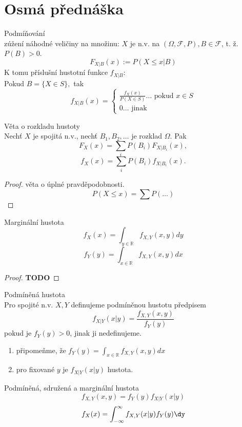 \documentclass[../main.tex]{subfiles}
\begin{document}
\section{Osmá přednáška}

\begin{definition}
    Podmíňování\\

    zúžení náhodné veličiny na množinu: $X$ je n.v. na $(\Omega, \mathcal{F},P), B \in \mathcal{F}$, t. ž. $P(B) >0$.
    \[F_{X|B}(x):= P(X \leq x |B)\]
    K tomu příslušní hustotní funkce $f_{X|B}$:\\
    Pokud $B = \{X\in S\},$ tak 
    \[f_{X|B}(x) = 
    \begin{cases}    
        \frac{f_X(x)}{P(X\in S)} \dots \text{ pokud } x\in S\\
        0 \dots \text{ jinak }
    \end{cases}\]
\end{definition}
\begin{theorem}
    Věta o rozkladu hustoty\\

    Nechť $X$ je spojitá n.v., nechť $B_1,B_2,\dots$ je rozklad $\Omega$. Pak
    \[F_X(x) = \sum_i P(B_i)F_{X|B_i}(x),\]
    \[f_X(x) = \sum_i P(B_i)f_{X|B_i}(x).\]
    \begin{proof}
        věta o úplné pravděpodobnosti. 
        \[P(X\leq x) = \sum P(\dots)\]
    \end{proof}
\end{theorem}

\begin{theorem}
    Marginální hustota\\

    \[f_X(x) = \int_{y\in \mathbb{R}} f_{X,Y}(x,y)dy\]
    \[f_Y(y) = \int_{x\in \mathbb{R}} f_{X,Y}(x,y)dx\]
\end{theorem}
\begin{proof}
    \textbf{TODO}
\end{proof}

\begin{definition}
    Podmíněná hustota\\

    Pro spojité n.v. $X,Y$ definujeme podmíněnou hustotu předpisem
    \[f_{X|Y}(x|y) = \frac{f_{X,Y}(x,y)}{f_{Y}(y)}\]
    pokud je $f_Y(y) > 0$, jinak ji nedefinujeme.
    \begin{enumerate}
        \item připomeňme, že $f_Y(y) = \int_{x\in \mathbb{R}}f_{X,Y}(x,y)dx$
        \item pro fixované $y$ je $f_{X|Y}(x|y)$ hustota.
    \end{enumerate}
\end{definition}
\begin{theorem}
    Podmíněná, sdružená a marginální hustota\\

    \[f_{X,Y}(x,y) = f_Y(y)f_{X|Y}(x|y)\]
    \[f_X(x) = \int^\infty_{-\infty} f_{X,Y}(x|y)f_Y(y)\dy\]
\end{theorem}
\end{document}
